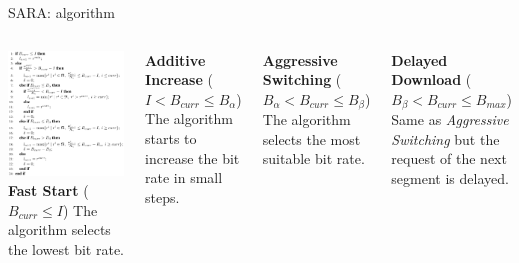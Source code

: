 \documentclass[10pt]{beamer}
\begin{document}
\begin{frame}[fragile]{SARA: algorithm}
	\begin{columns}
        	\centering
            \includegraphics[width=\textwidth]{img/sara_algorithm}
        	\textbf{Fast Start} ($B_{curr}\leq I$) The algorithm selects the lowest bit rate.
            
            \textbf{Additive Increase} ($I<B_{curr}\leq B_{\alpha}$) The algorithm starts to increase the bit rate in small steps.
            
            \textbf{Aggressive Switching} ($B_\alpha < B_{curr} \leq B_\beta$) The algorithm selects the most suitable bit rate.
            
            \textbf{Delayed Download} ($B_\beta < B_{curr}\leq B_{max}$) Same as \textit{Aggressive Switching} but the request of the next segment is delayed.
\end{columns}
\end{frame}
\end{document}
